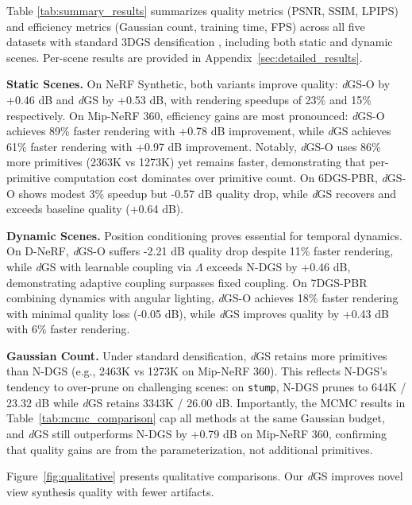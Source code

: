 \documentclass{article}
\newcommand{\modelname}{\textit{d}GS}
\theoremstyle{plain}
\theoremstyle{definition}
\theoremstyle{remark}
\begin{document}
Table \ref{tab:summary_results} summarizes quality metrics (PSNR, SSIM, LPIPS) and efficiency metrics (Gaussian count, training time, FPS) across all five datasets with standard 3DGS densification \citep{3dgs}, including both static and dynamic scenes. Per-scene results are provided in Appendix~\ref{sec:detailed_results}.

\textbf{Static Scenes.}
On NeRF Synthetic, both variants improve quality: \textit{d}GS-O by +0.46 dB and \textit{d}GS by +0.53 dB, with rendering speedups of 23\% and 15\% respectively. On Mip-NeRF 360, efficiency gains are most pronounced: \textit{d}GS-O achieves 89\% faster rendering with +0.78 dB improvement, while \textit{d}GS achieves 61\% faster rendering with +0.97 dB improvement. Notably, \textit{d}GS-O uses 86\% more primitives (2363K vs 1273K) yet remains faster, demonstrating that per-primitive computation cost dominates over primitive count. On 6DGS-PBR, \textit{d}GS-O shows modest 3\% speedup but -0.57 dB quality drop, while \textit{d}GS recovers and exceeds baseline quality (+0.64 dB).

\textbf{Dynamic Scenes.}
Position conditioning proves essential for temporal dynamics. On D-NeRF, \textit{d}GS-O suffers -2.21 dB quality drop despite 11\% faster rendering, while \textit{d}GS with learnable coupling via $\Lambda$ exceeds N-DGS by +0.46 dB, demonstrating adaptive coupling surpasses fixed coupling. On 7DGS-PBR combining dynamics with angular lighting, \textit{d}GS-O achieves 18\% faster rendering with minimal quality loss (-0.05 dB), while \textit{d}GS improves quality by +0.43 dB with 6\% faster rendering.

\textbf{Gaussian Count.} Under standard densification, \modelname{} retains more primitives than N-DGS (e.g., 2463K vs 1273K on Mip-NeRF 360). This reflects N-DGS's tendency to over-prune on challenging scenes: on \texttt{stump}, N-DGS prunes to 644K / 23.32 dB while \textit{d}GS retains 3343K / 26.00 dB. Importantly, the MCMC results in Table~\ref{tab:mcmc_comparison} cap all methods at the same Gaussian budget, and \textit{d}GS still outperforms N-DGS by +0.79 dB on Mip-NeRF 360, confirming that quality gains are from the parameterization, not additional primitives.

Figure~\ref{fig:qualitative} presents qualitative comparisons. Our \textit{d}GS improves novel view synthesis quality with fewer artifacts.
\end{document}
